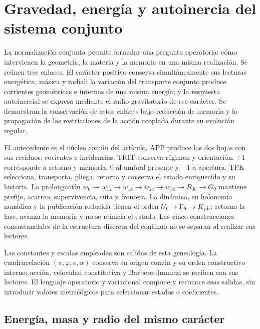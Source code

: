 \section{Gravedad, energía y autoinercia del sistema conjunto}
\label{hmtcuatro:gea:seccion}

La normalización conjunta permite formular una pregunta operatoria:
cómo intervienen la geometría, la materia y la memoria en una misma
realización. Se reúnen tres enlaces. El carácter positivo conserva
simultáneamente sus lecturas energética, másica y radial; la variación
del transporte conjunto produce corrientes geométricas e internas de
una misma energía; y la respuesta autoinercial se expresa mediante el
radio gravitatorio de ese carácter. Se demuestran la conservación de
estos enlaces bajo reducción de memoria y la propagación de las
restricciones de la acción acoplada durante su evolución regular.

El antecedente es el núcleo común del artículo. APP produce las dos
hojas con sus residuos, cocientes e incidencias; TRIT conserva régimen
y orientación: $+1$ corresponde a retorno y memoria, $0$ al umbral
presente y $-1$ a apertura. TPK selecciona, transporta, pliega, retorna
y conserva el estado enriquecido y su historia. La prolongación
$w_6\to w_{12}\to w_{18}\to w_{24}\to w_{30}\to R_{36}\to G_9$
mantiene prefijo, acarreo, supervivencia, ruta y frontera. La dinámica,
su holonomía nonádica y la publicación reducida tienen el orden
$U_t\to\Gamma_9\to K_{\rm ph}$: retorna la fase, avanza la memoria
y no se reinicia el estado. Las cinco construcciones consustanciales
de la estructura discreta del continuo no se separan al realizar sus lectores.

Las constantes y escalas empleadas son salidas de esta genealogía.
La cuadrirrelación $(\pi,\varphi,e,\alpha)$ conserva su origen común
y su orden constructivo interno; acción, velocidad constitutiva y
Barbero--Immirzi se reciben con sus lectores. El lenguaje operatorio
y variacional compone y reconoce esas salidas, sin introducir valores
metrológicos para seleccionar estados o coeficientes.

\subsection{Energía, masa y radio del mismo carácter}
\label{hmtcuatro:gea:caracter}

